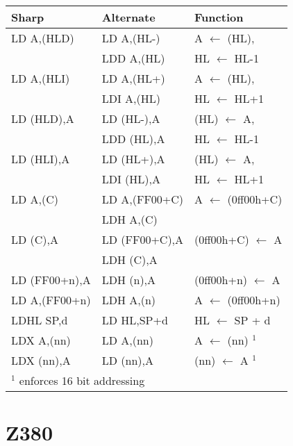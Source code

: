 \documentclass[12pt,twoside]{report}
\begin{document}
\begin{center}\begin{tabular}{|l|l|l|}
\hline
Sharp & Alternate & Function \\
\hline
\hline
LD A,(HLD)    & LD A,(HL-)  & A $\longleftarrow$ (HL), \\
              & LDD A,(HL)  & HL $\longleftarrow$ HL-1 \\
\hline
LD A,(HLI)    & LD A,(HL+)  & A $\longleftarrow$ (HL), \\
              & LDI A,(HL)  & HL $\longleftarrow$ HL+1 \\
\hline
LD (HLD),A    & LD (HL-),A  & (HL) $\longleftarrow$ A, \\
              & LDD (HL),A  & HL $\longleftarrow$ HL-1 \\
\hline
LD (HLI),A    & LD (HL+),A  & (HL) $\longleftarrow$ A, \\
              & LDI (HL),A  & HL $\longleftarrow$ HL+1 \\
\hline
LD A,(C)      & LD A,(FF00+C) & A $\longleftarrow$ (0ff00h+C) \\
              & LDH A,(C)     & \\
\hline
LD (C),A      & LD (FF00+C),A & (0ff00h+C) $\longleftarrow$ A \\
              & LDH (C),A     & \\
\hline
LD (FF00+n),A & LDH (n),A     & (0ff00h+n) $\longleftarrow$ A \\
\hline
LD A,(FF00+n) & LDH A,(n)     & A $\longleftarrow$ (0ff00h+n) \\
\hline
LDHL SP,d     & LD HL,SP+d    & HL $\longleftarrow$ SP + d \\
\hline
LDX A,(nn)    & LD A,(nn)     & A $\longleftarrow$ (nn) $^{1}$ \\
\hline
LDX (nn),A    & LD (nn),A     & (nn) $\longleftarrow$ A $^{1}$ \\
\hline
\multicolumn{3}{|l|}{$^{1}$ enforces 16 bit addressing } \\
\hline
\end{tabular}\end{center}
 

\section{Z380}
\end{document}

